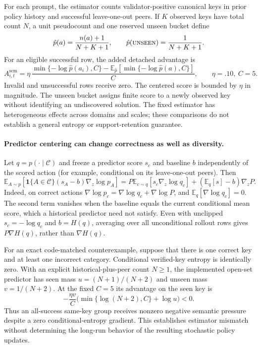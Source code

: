 \documentclass{article}
\newcommand{\1}{\mathbf 1}
\newcommand{\E}{\mathbb E}
\theoremstyle{remark}
\theoremstyle{definition}
\theoremstyle{plain}
\begin{document}
For each prompt, the estimator counts validator-positive canonical keys in
prior policy history and successful leave-one-out peers. If $K$ observed keys
have total count $N$, a unit pseudocount and one reserved unseen bucket define
\begin{equation}
  \hat p(a)=\frac{n(a)+1}{N+K+1},\qquad
  \hat p(\textsc{unseen})=\frac{1}{N+K+1}.
  \label{eq:open-set-predictor}
\end{equation}
For an eligible successful row, the added detached advantage is
\begin{equation}
  A^{\mathrm{sem}}_{i,t}
  =\eta\,\frac{\min\{-\log\hat p(a_i),C\}
    -\E_{\hat p}[\min\{-\log\hat p(a),C\}]}{C},
  \qquad \eta=.10,\ C=5.
  \label{eq:legacy-semantic-advantage}
\end{equation}
Invalid and unsuccessful rows receive zero. The centered score is bounded by
$\eta$ in magnitude. The unseen bucket assigns finite score to a newly observed
key without identifying an undiscovered solution. The fixed estimator has
heterogeneous effects across domains and scales; these comparisons do not
establish a general entropy or support-retention guarantee.

\paragraph{Predictor centering can change correctness as well as diversity.}
Let $q=p(\cdot\mid\mathcal C)$ and freeze a predictor score $s_c$ and baseline
$b$ independently of the scored action (for example, conditional on its
leave-one-out peers). Then
\[
 \E_{A\sim p}\!\left[\1\{A\in\mathcal C\}(s_A-b)
                  \nabla_z\log p_A\right]
 =P\E_{c\sim q}[s_c\nabla_z\log q_c]
  +(\E_q[s]-b)\nabla_zP.
\]
Indeed, on correct actions
$\nabla\log p_c=\nabla\log q_c+\nabla\log P$, and
$\E_q[\nabla\log q_c]=0$.
The second term vanishes when the baseline equals the current conditional
mean score, which a historical predictor need not satisfy. Even with
unclipped $s_c=-\log q_c$ and $b=H(q)$, averaging over all unconditional
rollout rows gives $P\nabla H(q)$, rather than $\nabla H(q)$.

For an exact code-matched counterexample, suppose that there is one correct
key and at least one incorrect category. Conditional verified-key entropy is
identically zero. With an explicit historical-plus-peer count $N\ge1$, the
implemented open-set predictor has seen mass $u=(N+1)/(N+2)$ and unseen mass
$v=1/(N+2)$. At the fixed $C=5$ its advantage on the seen key is
\[
 -\frac{\eta v}{C}\bigl(\min\{\log(N+2),C\}+\log u\bigr)<0.
\]
Thus an all-success same-key group receives nonzero negative semantic
pressure despite a zero conditional-entropy gradient. This establishes
estimator mismatch without determining the long-run behavior of the resulting
stochastic policy updates.
\end{document}
